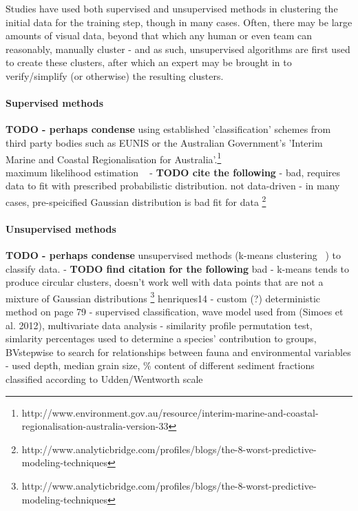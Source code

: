\documentclass[12pt]{article}
\begin{document}
            Studies have used both supervised and unsupervised methods in clustering the initial data for the training step, though in many cases. Often, there may be large amounts of visual data, beyond that which any human or even team can reasonably, manually cluster - and as such, unsupervised algorithms are first used to create these clusters, after which an expert may be brought in to verify/simplify (or otherwise) the resulting clusters.~\citep*{steinberg11} 

            \paragraph{Supervised methods}
            \textbf{TODO - perhaps condense} using established 'classification' schemes from third party bodies such as EUNIS or the Australian Government's 'Interim Marine and Coastal Regionalisation for Australia'.\footnote{http://www.environment.gov.au/resource/interim-marine-and-coastal-regionalisation-australia-version-33}\\
            maximum likelihood estimation ~\citep*{micallef12} - \textbf{TODO cite the following} - bad, requires data to fit with prescribed probabilistic distribution. not data-driven  - in many cases, pre-speicified Gaussian distribution is bad fit for data \footnote{http://www.analyticbridge.com/profiles/blogs/the-8-worst-predictive-modeling-techniques}\\

            \paragraph{Unsupervised methods}
            \textbf{TODO - perhaps condense} unsupervised methods (k-means clustering ~\citep*{henriques14}) to classify data. - \textbf{TODO find citation for the following} bad - k-means tends to produce circular clusters, doesn't work well with data points that are not a mixture of Gaussian distributions \footnote{http://www.analyticbridge.com/profiles/blogs/the-8-worst-predictive-modeling-techniques}
            henriques14 - custom (?) deterministic method on page 79 - supervised classification, wave model used from (Simoes et al. 2012), multivariate data analysis - similarity profile permutation test, simlarity percentages used to determine a species' contribution to groups, BVstepwise to search for relationships between fauna and environmental variables - used depth, median grain size, \% content of different sediment fractions classified according to Udden/Wentworth scale~\citep*{henriques14}
\end{document}
